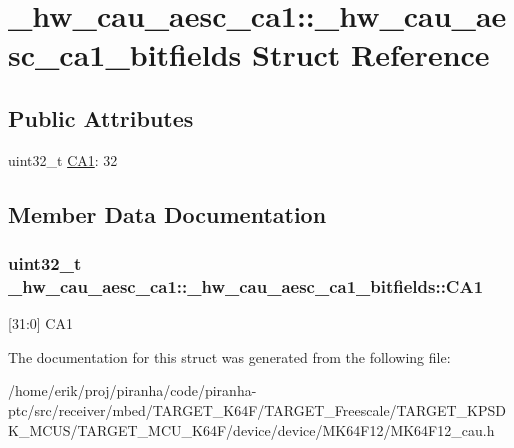 \hypertarget{struct__hw__cau__aesc__ca1_1_1__hw__cau__aesc__ca1__bitfields}{}\section{\+\_\+hw\+\_\+cau\+\_\+aesc\+\_\+ca1\+:\+:\+\_\+hw\+\_\+cau\+\_\+aesc\+\_\+ca1\+\_\+bitfields Struct Reference}
\label{struct__hw__cau__aesc__ca1_1_1__hw__cau__aesc__ca1__bitfields}
\subsection*{Public Attributes}
\begin{DoxyCompactItemize}
\item 
uint32\+\_\+t \hyperlink{struct__hw__cau__aesc__ca1_1_1__hw__cau__aesc__ca1__bitfields_ab2369351eeae1d7a5e750fae4e04e309}{C\+A1}\+: 32
\end{DoxyCompactItemize}


\subsection{Member Data Documentation}
\subsubsection[{\texorpdfstring{C\+A1}{CA1}}]{\setlength{\rightskip}{0pt plus 5cm}uint32\+\_\+t \+\_\+hw\+\_\+cau\+\_\+aesc\+\_\+ca1\+::\+\_\+hw\+\_\+cau\+\_\+aesc\+\_\+ca1\+\_\+bitfields\+::\+C\+A1}\hypertarget{struct__hw__cau__aesc__ca1_1_1__hw__cau__aesc__ca1__bitfields_ab2369351eeae1d7a5e750fae4e04e309}{}\label{struct__hw__cau__aesc__ca1_1_1__hw__cau__aesc__ca1__bitfields_ab2369351eeae1d7a5e750fae4e04e309}
\mbox{[}31\+:0\mbox{]} C\+A1 

The documentation for this struct was generated from the following file\+:\begin{DoxyCompactItemize}
\item 
/home/erik/proj/piranha/code/piranha-\/ptc/src/receiver/mbed/\+T\+A\+R\+G\+E\+T\+\_\+\+K64\+F/\+T\+A\+R\+G\+E\+T\+\_\+\+Freescale/\+T\+A\+R\+G\+E\+T\+\_\+\+K\+P\+S\+D\+K\+\_\+\+M\+C\+U\+S/\+T\+A\+R\+G\+E\+T\+\_\+\+M\+C\+U\+\_\+\+K64\+F/device/device/\+M\+K64\+F12/M\+K64\+F12\+\_\+cau.\+h\end{DoxyCompactItemize}
